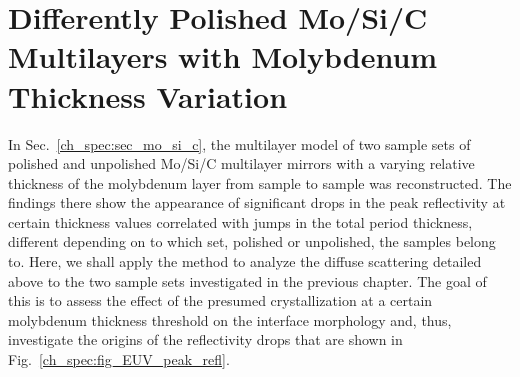 \section{Differently Polished Mo/Si/C Multilayers with Molybdenum Thickness Variation} \label{ch_diff:sec_mo_si_c}
In Sec.~\ref{ch_spec:sec_mo_si_c}, the multilayer model of two sample sets of polished and unpolished Mo/Si/C multilayer mirrors with a varying relative thickness of the molybdenum layer from sample to sample was reconstructed. The findings there show the appearance of significant drops in the peak reflectivity at certain thickness values correlated with jumps in the total period thickness, different depending on to which set, polished or unpolished, the samples belong to. Here, we shall apply the method to analyze the diffuse scattering detailed above to the two sample sets investigated in the previous chapter. The goal of this is to assess the effect of the presumed crystallization at a certain molybdenum thickness threshold on the interface morphology and, thus, investigate the origins of the reflectivity drops that are shown in Fig.~\ref{ch_spec:fig_EUV_peak_refl}.

